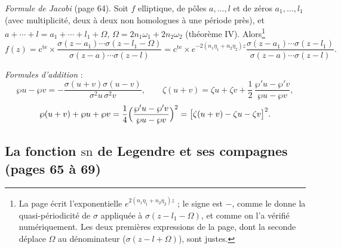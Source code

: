\documentclass[11pt,a4paper]{article}
\begin{document}
\emph{Formule de Jacobi} (page 64). Soit $f$ elliptique, de pôles $a, \ldots,
l$ et de zéros $a_1, \ldots, l_1$ (avec multiplicité, deux à deux non
homologues à une période près), et $a + \cdots + l = a_1 + \cdots + l_1 + \Omega$,
$\Omega = 2n_1\omega_1 + 2n_2\omega_2$ (théorème IV). Alors\footnote{La page écrit l'exponentielle $e^{2(n_1\eta_1 + n_2\eta_2)z}$ ; le
signe est $-$, comme le donne la quasi-périodicité de $\sigma$ appliquée à
$\sigma(z - l_1 - \Omega)$, et comme on l'a vérifié numériquement. Les deux
premières expressions de la page, dont la seconde déplace $\Omega$ au
dénominateur ($\sigma(z - l + \Omega)$), sont justes.}
\[
f(z) = \text{c}^{\text{te}} \times \frac{\sigma(z - a_1)\cdots\sigma(z - l_1 -
\Omega)}{\sigma(z-a)\cdots\sigma(z-l)}
= \text{c}^{\text{te}} \times e^{-2(n_1\eta_1 + n_2\eta_2)z}
\frac{\sigma(z-a_1)\cdots\sigma(z-l_1)}{\sigma(z-a)\cdots\sigma(z-l)} .
\]


\emph{Formules d'addition} :
\[
\wp u - \wp v = -\frac{\sigma(u+v)\sigma(u-v)}{\sigma^2u\,\sigma^2v},
\qquad
\zeta(u+v) = \zeta u + \zeta v + \frac12\,\frac{\wp'u - \wp'v}{\wp u - \wp v},
\]
\[
\wp(u+v) + \wp u + \wp v = \frac14\Bigl(\frac{\wp'u - \wp'v}{\wp u - \wp v}\Bigr)^2
= \bigl[\zeta(u+v) - \zeta u - \zeta v\bigr]^2 .
\]

\subsection*{La fonction $\mathrm{sn}$ de Legendre et ses compagnes (pages 65 à 69)}
\end{document}

